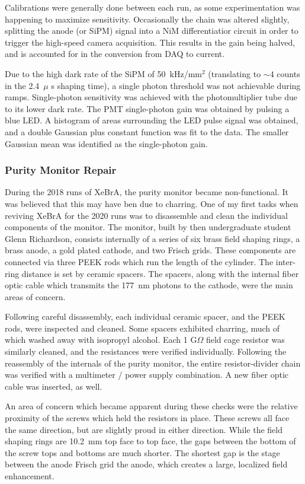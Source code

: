 Calibrations were generally done between each run, as some experimentation was happening to maximize sensitivity.
Occasionally the chain was altered slightly, splitting the anode (or SiPM) signal into a NiM differentiatior circuit in order to trigger the high-speed camera acquisition.
This results in the gain being halved, and is accounted for in the conversion from DAQ to current.

Due to the high dark rate of the SiPM of 50~kHz/mm$^2$\cite{noauthor_silicon_nodate} (translating to $\sim 4$ counts in the 2.4~$\mu$ s shaping time), a single photon threshold was not achievable during ramps.
Single-photon sensitivity was achieved with the photomultiplier tube due to its lower dark rate.
The PMT single-photon gain was obtained by pulsing a blue LED.
A histogram of areas surrounding the LED pulse signal was obtained, and a double Gaussian plus constant function was fit to the data.
The smaller Gaussian mean was identified as the single-photon gain.

\subsubsection{Purity Monitor Repair}
During the 2018 runs of XeBrA, the purity monitor became non-functional.
It was believed that this may have ben due to charring.
One of my first tasks when reviving XeBrA for the 2020 runs was to disassemble and clean the individual components of the monitor.
The monitor, built by then undergraduate student Glenn Richardson, consists internally of a series of six brass field shaping rings, a brass anode, a gold plated cathode, and two Frisch grids.
These components are connected via three PEEK rods which run the length of the cylinder.
The inter-ring distance is set by ceramic spacers.
The spacers, along with the internal fiber optic cable which transmits the 177~nm photons to the cathode, were the main areas of concern.

Following careful disassembly, each individual ceramic spacer, and the PEEK rods, were inspected and cleaned.
Some spacers exhibited charring, much of which washed away with isopropyl alcohol.
Each 1 G$\Omega$ field cage resistor was similarly cleaned, and the resistances were verified individually.
Following the reassembly of the internals of the purity monitor, the entire resistor-divider chain was verified with a multimeter / power supply combination.
A new fiber optic cable was inserted, as well.

An area of concern which became apparent during these checks were the relative proximity of the screws which held the resistors in place.
These screws all face the same direction, but are slightly proud in either direction.
While the field shaping rings are 10.2~mm top face to top face, the gaps between the bottom of the screw tops and bottoms are much shorter.
The shortest gap is the stage between the anode Frisch grid the anode, which creates a large, localized field enhancement.

